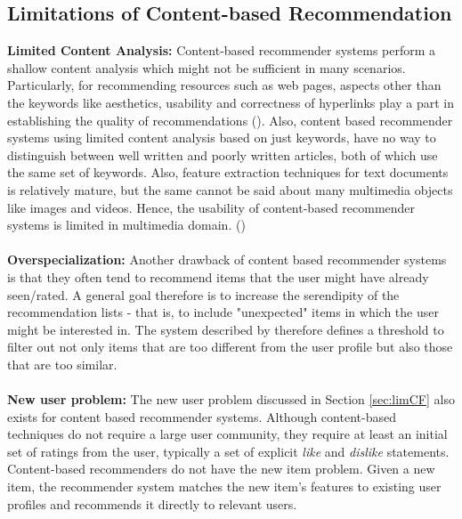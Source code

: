 \subsection{Limitations of Content-based Recommendation}
\textbf{Limited Content Analysis:} Content-based recommender systems perform a shallow content analysis which might not be sufficient in many scenarios. Particularly, for recommending resources such as web pages, aspects other than the keywords like aesthetics, usability and correctness of hyperlinks play a part in establishing the quality of recommendations (\cite{jannach}).
Also, content based recommender systems using limited content analysis based on just keywords, have no way to distinguish between well written and poorly written articles, both of which use the same set of keywords. 
Also, feature extraction techniques for text documents is relatively mature, but the same cannot be said about many multimedia objects like images and videos.
Hence, the usability of content-based recommender systems is limited in multimedia domain. (\cite{adom2005})\\
\\
\textbf{Overspecialization:}  Another drawback of content based recommender systems is that they often tend to recommend items that the user might have already seen/rated. 
A general goal therefore is to increase the serendipity of the recommendation lists - that is, to include "unexpected" items in which the user might be interested in.
The system described by \cite{billsus} therefore defines a threshold to filter out not only items that are too different from the user profile but also those that are too similar.\\
\\
\textbf{New user problem:} The new user problem discussed in Section \ref{sec:limCF} also exists for content based recommender systems.
Although content-based techniques do not require a large user community, they require at least an initial set of ratings from the user, typically a set of explicit \textit{like} and \textit{dislike} statements.
Content-based recommenders do not have the new item problem. 
Given a new item, the recommender system matches the new item's features to existing user profiles and recommends it directly to relevant users.


